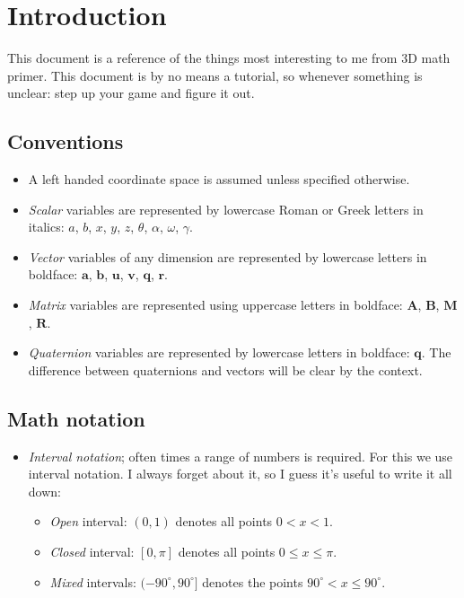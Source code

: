 \section{Introduction}

This document is a reference of the things most interesting to me from 3D math primer. This document is by no means a tutorial, so whenever something is unclear: step up your game and figure it out.

\subsection{Conventions}

\begin{itemize}
\item A left handed coordinate space is assumed unless specified otherwise.
\item \textit{Scalar} variables are represented by lowercase Roman or Greek letters in italics: $a$, $b$, $x$, $y$, $z$, $\theta$,
  $\alpha$, $\omega$, $\gamma$.
\item
  \textit{Vector} variables of any dimension are represented by lowercase
  letters in boldface: $\mathbf{a}$, $\mathbf{b}$, $\mathbf{u}$, $\mathbf{v}$, $\mathbf{q}$, $\mathbf{r}$.
\item \textit{Matrix} variables are represented using uppercase letters in
  boldface: $\mathbf{A}$, $\mathbf{B}$, $\mathbf{M}$, $\mathbf{R}$.
 \item \textit{Quaternion} variables are represented by lowercase letters in boldface: $\textbf{q}$. The difference between quaternions and vectors will be clear by the context.
\end{itemize}

\subsection{Math notation}

\begin{itemize}
	\item \textit{Interval notation}; often times a range of numbers is required. For this we use interval notation. I always forget about it, so I guess it's useful to write it all down:
	\begin{itemize}
		\item \textit{Open} interval: $(0,1)$ denotes all points $0 < x < 1$.
		\item \textit{Closed} interval: $[0,\pi]$ denotes all points $0 \leq x \leq \pi$.
		\item \textit{Mixed} intervals: $(-90^\circ, 90^\circ]$ denotes the points $90^\circ < x \leq 90^\circ$.
	\end{itemize}
\end{itemize}
